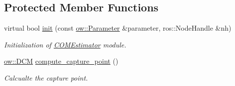 \subsection*{Protected Member Functions}
\begin{DoxyCompactItemize}
\item 
virtual bool \hyperlink{classow__com_1_1COMEstimator_ac30dad4021919bc434ebb8a2b903163a}{init} (const \hyperlink{classow_1_1Parameter}{ow\+::\+Parameter} \&parameter, ros\+::\+Node\+Handle \&nh)\hypertarget{classow__com_1_1COMEstimator_ac30dad4021919bc434ebb8a2b903163a}{}\label{classow__com_1_1COMEstimator_ac30dad4021919bc434ebb8a2b903163a}

\begin{DoxyCompactList}\small\item\em Initialization of \hyperlink{classow__com_1_1COMEstimator}{C\+O\+M\+Estimator} module. \end{DoxyCompactList}\item 
\hyperlink{classow__core_1_1DivergentComponentOfMotion}{ow\+::\+D\+CM} \hyperlink{classow__com_1_1COMEstimator_a527094baefbfdea956df197f87251c61}{compute\+\_\+capture\+\_\+point} ()\hypertarget{classow__com_1_1COMEstimator_a527094baefbfdea956df197f87251c61}{}\label{classow__com_1_1COMEstimator_a527094baefbfdea956df197f87251c61}

\begin{DoxyCompactList}\small\item\em Calcualte the capture point. \end{DoxyCompactList}\end{DoxyCompactItemize}
